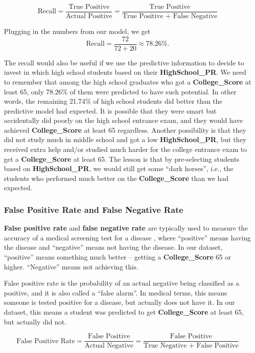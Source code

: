 \documentclass[
]{article}
\begin{document}
\[\text{Recall} = \dfrac{\text{True Positive}}{\text{Actual Positive}} = \dfrac{\text{True Positive}}{\text{True Positive + False Negative}}\]

Plugging in the numbers from our model, we get
\[\text{Recall} = \dfrac{72}{72+20} \approx 78.26\%.\]

The recall would also be useful if we use the predictive information to
decide to invest in which high school students based on their
\textbf{HighSchool\_PR}. We need to remember that among the high school
graduates who got a \textbf{College\_Score} at least 65, only 78.26\% of
them were predicted to have such potential. In other words, the
remaining 21.74\% of high school students did better than the predictive
model had expected. It is possible that they were smart but accidentally
did poorly on the high school entrance exam, and they would have
achieved \textbf{College\_Score} at least 65 regardless. Another
possibility is that they did not study much in middle school and got a
low \textbf{HighSchool\_PR}, but they received extra help and/or studied
much harder for the college entrance exam to get a
\textbf{College\_Score} at least 65. The lesson is that by pre-selecting
students based on \textbf{HighSchool\_PR}, we would still get some
``dark horses'', i.e., the students who performed much better on the
\textbf{College\_Score} than we had expected.

\subsubsection{False Positive Rate and False Negative Rate}

\textbf{False positive rate} and \textbf{false negative rate} are
typically used to measure the accuracy of a medical screening test for a
disease \citep{diagnosis-test}, where ``positive'' means having the
disease and ``negative'' means not having the disease. In our dataset,
``positive'' means something much better -- getting a
\textbf{College\_Score} 65 or higher. ``Negative'' means not achieving
this.

False positive rate is the probability of an actual negative being
classified as a positive, and it is also called a ``false alarm''. In
medical terms, this means someone is tested positive for a disease, but
actually does not have it. In our dataset, this means a student was
predicted to get \textbf{College\_Score} at least 65, but actually did
not.

\[\text{False Positive Rate} = \dfrac{\text{False Positive}}{\text{Actual Negative}} = \dfrac{\text{False Positive}}{\text{True Negative + False Positive}}\]
\end{document}
